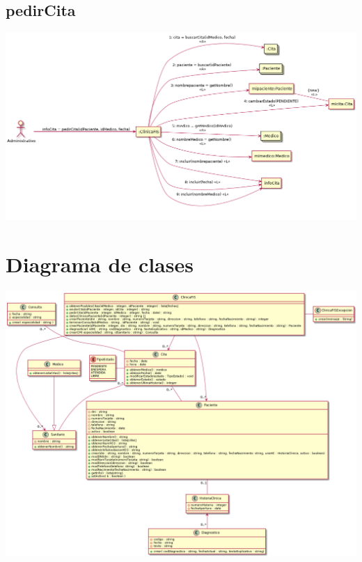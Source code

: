 \documentclass[10pt,a4paper,spanish]{report}
\begin{document}
\subsection*{pedirCita}
\begin{center}
	\includegraphics[scale=0.35]{pedirCita.png}
\end{center}

\section*{Diagrama de clases}

\begin{center}
	\includegraphics[scale=0.35]{DiagramaDeClases.png}
\end{center}
\end{document}
